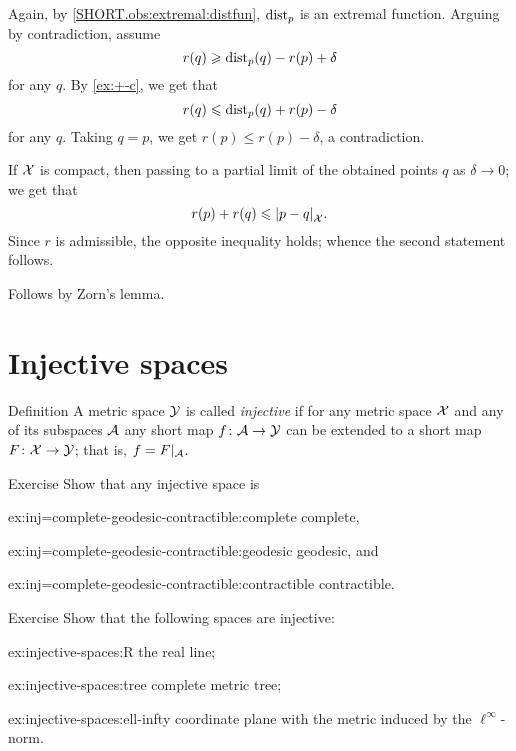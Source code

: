 Again, by \ref{SHORT.obs:extremal:distfun}, $\mathrm{dist}_p$ is an extremal function.
Arguing by contradiction, assume 
\[r(q)\geqslant \mathrm{dist}_p(q)-r(p)+\delta\]
for any $q$.
By \ref{ex:+-c}, we get that
\[r(q)\leqslant \mathrm{dist}_p(q)+r(p)-\delta\]
for any $q$.
Taking $q=p$, we get $r(p)\le r(p)-\delta$, a contradiction.

If $\mathcal{X}$ is compact, then passing to a partial limit of the obtained points $q$ as $\delta\to 0$; we get that 
\[r(p)+r(q)\le\dist{p}{q}{\spc{X}}.\]
Since $r$ is admissible, the opposite inequality holds;
whence the second statement follows.

Follows by Zorn's lemma. 
\qeds

\section{Injective spaces}

\begin{thm}{Definition}\label{def:injective}
A metric space $\mathcal{Y}$ is called \emph{injective} if for any metric space $\mathcal{X}$ and any of its subspaces $\mathcal{A}$
any short map $f\colon\mathcal{A}\to \mathcal{Y}$ can be extended to a short map $F\colon\mathcal{X}\to \mathcal{Y}$;
that is, $f=F|_{\mathcal{A}}$.
\end{thm}

\begin{thm}{Exercise}\label{ex:inj=complete-geodesic-contractible}
Show that any injective space is 

\begin{subthm}{ex:inj=complete-geodesic-contractible:complete}
complete,
\end{subthm}

\begin{subthm}{ex:inj=complete-geodesic-contractible:geodesic}
geodesic, and
\end{subthm}

\begin{subthm}{ex:inj=complete-geodesic-contractible:contractible}
contractible.
\end{subthm}
\end{thm}


\begin{thm}{Exercise}\label{ex:injective-spaces}
Show that the following spaces are injective:
\begin{subthm}{ex:injective-spaces:R}
the real line;
\end{subthm}

\begin{subthm}{ex:injective-spaces:tree}
complete metric tree;
\end{subthm}

\begin{subthm}{ex:injective-spaces:ell-infty}
coordinate plane with the metric induced by the $\ell^\infty$-norm.
\end{subthm}

\end{thm}


